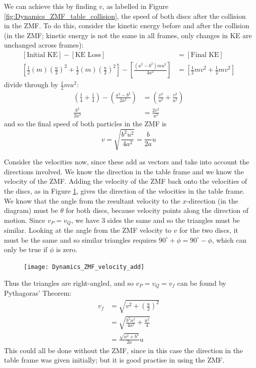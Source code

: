 \begin{hint}
{\begin{enumerate}
We can achieve this by finding $v$, as labelled in Figure \ref{fig:Dynamics_ZMF_table_collision}, the speed of both discs after the collision in the ZMF. To do this, consider the kinetic energy before and after the collision (in the ZMF; kinetic energy is not the same in all frames, only changes in KE are unchanged across frames):
\begin{align*} \left[ \textrm{Initial KE} \right] - \left[ \textrm{KE Loss}\right] &= \left[ \textrm{Final KE} \right] \\
\left[ \frac{1}{2}(m)\left(\frac{u}{2}\right)^{2} + \frac{1}{2}(m)\left(\frac{u}{2}\right)^{2} \right] - \left[\frac{(a^{2} - b^{2})mu^{2}}{4a^{2}}\right] &= \left[ \frac{1}{2}mv^{2} + \frac{1}{2}mv^{2}\right]\end{align*}
divide through by $\frac{1}{2}mu^{2}$:
\begin{align*} \left( \frac{1}{4} + \frac{1}{4} \right) - \left( \frac{a^{2} - b^{2}}{2a^{2}} \right) &= \left( \frac{v^{2}}{u^{2}} + \frac{v^{2}}{u^{2}} \right) \\
\frac{b^2}{2a^{2}} &= \frac{2v^{2}}{u^{2}} \end{align*}
and so the final speed of both particles in the ZMF is
\begin{equation*} v = \sqrt{\frac{b^{2}u^{2}}{4a^{2}}} = \frac{b}{2a} u \end{equation*}

Consider the velocities now, since these add as vectors and take into account the directions involved. We know the direction in the table frame and we know the velocity of the ZMF. Adding the velocity of the ZMF back onto the velocities of the discs, as in Figure \ref{fig:Dynamics_ZMF_velocity_add}, gives the direction of the velocities in the table frame. We know that the angle from the resultant velocity to the $x$-direction (in the diagram) must be $\theta$ for both discs, because velocity points along the direction of motion. Since $v_{P} = v_{Q}$, we have 3 sides the same and so the triangles must be similar. Looking at the angle from the ZMF velocity to $v$ for the two discs, it must be the same and so similar triangles requires $90^{\circ} + \phi = 90^{\circ} - \phi$, which can only be true if $\phi$ is zero.

\begin{figure}[h]
\centering
\texttt{[image: Dynamics\_ZMF\_velocity\_add]}
\caption{}
\label{fig:Dynamics_ZMF_velocity_add}
\end{figure}

Thus the triangles are right-angled, and so $v_{P} = v_{Q} = v_{f}$ can be found by Pythagoras' Theorem:
\begin{align*} v_{f} &= \sqrt{ v^{2} + \left(\frac{u}{2}\right)^{2}} \\ &= \sqrt{ \frac{b^{2}u^{2}}{4a^{2}} + \frac{u^{2}}{4}} \\ &= \frac{\sqrt{a^{2} + b^{2}}}{2a} u \end{align*}
This could all be done without the ZMF, since in this case the direction in the table frame was given initially; but it is good practise in using the ZMF.


\end{enumerate}}
\end{hint}
